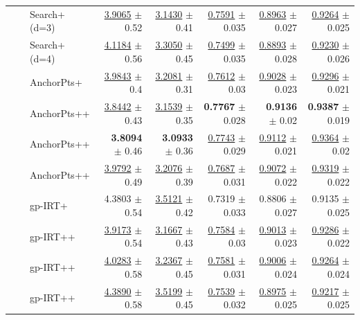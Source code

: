 \begin{longtable}{llp{}rrrrr}
 &  & Search+ (d=3) & \underline{3.9065} {\scriptsize $\pm$ 0.52} & \underline{3.1430} {\scriptsize $\pm$ 0.41} & \underline{0.7591} {\scriptsize $\pm$ 0.035} & \underline{0.8963} {\scriptsize $\pm$ 0.027} & \underline{0.9264} {\scriptsize $\pm$ 0.025} \\
 &  & Search+ (d=4) & \underline{4.1184} {\scriptsize $\pm$ 0.56} & \underline{3.3050} {\scriptsize $\pm$ 0.45} & \underline{0.7499} {\scriptsize $\pm$ 0.035} & \underline{0.8893} {\scriptsize $\pm$ 0.028} & \underline{0.9230} {\scriptsize $\pm$ 0.026} \\
 &  & AnchorPts+ & \underline{3.9843} {\scriptsize $\pm$ 0.4} & \underline{3.2081} {\scriptsize $\pm$ 0.31} & \underline{0.7612} {\scriptsize $\pm$ 0.03} & \underline{0.9028} {\scriptsize $\pm$ 0.023} & \underline{0.9296} {\scriptsize $\pm$ 0.021} \\
 &  & AnchorPts++ & \underline{3.8442} {\scriptsize $\pm$ 0.43} & \underline{3.1539} {\scriptsize $\pm$ 0.35} & \textbf{0.7767} {\scriptsize $\pm$ 0.028} & \textbf{0.9136} {\scriptsize $\pm$ 0.02} & \textbf{0.9387} {\scriptsize $\pm$ 0.019} \\
 &  & AnchorPts++ & \textbf{3.8094} {\scriptsize $\pm$ 0.46} & \textbf{3.0933} {\scriptsize $\pm$ 0.36} & \underline{0.7743} {\scriptsize $\pm$ 0.029} & \underline{0.9112} {\scriptsize $\pm$ 0.021} & \underline{0.9364} {\scriptsize $\pm$ 0.02} \\
 &  & AnchorPts++ & \underline{3.9792} {\scriptsize $\pm$ 0.49} & \underline{3.2076} {\scriptsize $\pm$ 0.39} & \underline{0.7687} {\scriptsize $\pm$ 0.031} & \underline{0.9072} {\scriptsize $\pm$ 0.022} & \underline{0.9319} {\scriptsize $\pm$ 0.022} \\
 &  & gp-IRT+ & 4.3803 {\scriptsize $\pm$ 0.54} & \underline{3.5121} {\scriptsize $\pm$ 0.42} & 0.7319 {\scriptsize $\pm$ 0.033} & 0.8806 {\scriptsize $\pm$ 0.027} & 0.9135 {\scriptsize $\pm$ 0.025} \\
 &  & gp-IRT++ & \underline{3.9173} {\scriptsize $\pm$ 0.54} & \underline{3.1667} {\scriptsize $\pm$ 0.43} & \underline{0.7584} {\scriptsize $\pm$ 0.03} & \underline{0.9013} {\scriptsize $\pm$ 0.023} & \underline{0.9286} {\scriptsize $\pm$ 0.022} \\
 &  & gp-IRT++ & \underline{4.0283} {\scriptsize $\pm$ 0.58} & \underline{3.2367} {\scriptsize $\pm$ 0.45} & \underline{0.7581} {\scriptsize $\pm$ 0.031} & \underline{0.9006} {\scriptsize $\pm$ 0.024} & \underline{0.9264} {\scriptsize $\pm$ 0.024} \\
 &  & gp-IRT++ & \underline{4.3890} {\scriptsize $\pm$ 0.58} & \underline{3.5199} {\scriptsize $\pm$ 0.45} & \underline{0.7539} {\scriptsize $\pm$ 0.032} & \underline{0.8975} {\scriptsize $\pm$ 0.025} & \underline{0.9217} {\scriptsize $\pm$ 0.025} \\

\end{longtable}
